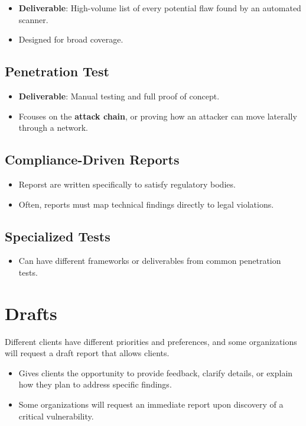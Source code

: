 \documentclass[12pt, letterpaper]{article}
\begin{document}
\begin{itemize}
    \item \textbf{Deliverable}: High-volume list of every potential flaw found by an automated scanner.
    \item Designed for broad coverage.
\end{itemize}

\subsection*{Penetration Test}

\begin{itemize}
    \item \textbf{Deliverable}: Manual testing and full proof of concept.
    \item Fcouses on the \textbf{attack chain}, or proving how an attacker can move laterally through a network.
\end{itemize}

\subsection*{Compliance-Driven Reports}

\begin{itemize}
    \item Reporst are written specifically to satisfy regulatory bodies.
    \item Often, reports must map technical findings directly to legal violations.
\end{itemize}

\subsection*{Specialized Tests}
\begin{itemize}
    \item Can have different frameworks or deliverables from common penetration tests.
\end{itemize}

\section*{Drafts}

Different clients have different priorities and preferences, and some organizations will request a draft report that allows clients.

\begin{itemize}
    \item Gives clients the opportunity to provide feedback, clarify details, or explain how they plan to address specific findings.
    \item Some organizations will request an immediate report upon discovery of a critical vulnerability.
\end{itemize}
\end{document}

